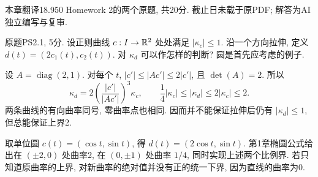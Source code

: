 \par{}
本章翻译18.950 Homework 2的两个原题, 共20分. 截止日未载于原PDF; 解答为AI独立编写与复审.

\begin{exercise}\label{ps:2-1}
原题PS2.1, 5分. 设正则曲线 $c:I\to\mathbb R^2$ 处处满足 $|\kappa_c|\le1$. 沿一个方向拉伸, 定义 $d(t)=(2c_1(t),c_2(t))$. 对 $\kappa_d$ 可以作怎样的判断? 圆是首先应考虑的例子.
\end{exercise}
\begin{solution}\label{pssol:2-1}
设 $A=\operatorname{diag}(2,1)$. 对每个 $t$, $|c'|\le|Ac'|\le2|c'|$, 且 $\det(A)=2$. 所以
\[
 \kappa_d=2\left(\frac{|c'|}{|Ac'|}\right)^3\kappa_c,
 \qquad \frac14|\kappa_c|\le|\kappa_d|\le2|\kappa_c|\le2.
\]
两条曲线的有向曲率同号, 零曲率点也相同. 因而并不能保证拉伸后仍有 $|\kappa_d|\le1$, 但总能保证上界2.

取单位圆 $c(t)=(\cos t,\sin t)$, 得 $d(t)=(2\cos t,\sin t)$. 第1章椭圆公式给出在 $(\pm2,0)$ 处曲率2, 在 $(0,\pm1)$ 处曲率 $1/4$, 同时实现上述两个比例界. 若只知道原曲率的上界, 对新曲率的绝对值并没有正的统一下界, 因为直线的曲率为0.
\end{solution}


